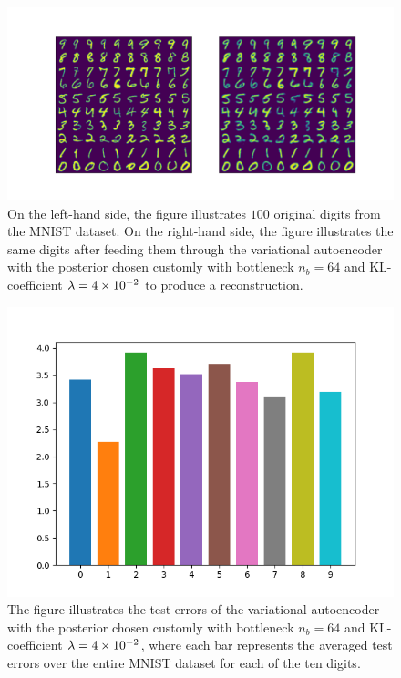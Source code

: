\begin{figure}
\begin{center}
      \includegraphics[trim = 15mm 10mm 15mm 15mm, clip, width=\linewidth]{convolutional_VAE_new_idea_KL_4e-2_10k_epochs_64D_inference}
\end{center}
\caption{On the left-hand side, the figure illustrates $100$ original digits from the MNIST dataset. On the right-hand side, the figure illustrates the same digits after feeding them through the variational autoencoder with the posterior chosen customly with bottleneck $n_b=64$ and KL-coefficient $\lambda=\num{4e-2}$ to produce a reconstruction.}\label{fig:convolutional_VAE_new_idea_KL_4e-2_10k_epochs_64D_inference}
\end{figure}


\begin{figure}
\begin{center}
      \includegraphics[width=0.49\linewidth]{convolutional_VAE_new_idea_KL_4e-2_10k_epochs_64D_errors}
\end{center}
\caption{The figure illustrates the test errors of the variational autoencoder with the posterior chosen customly with bottleneck $n_b=64$ and KL-coefficient $\lambda = \num{4e-2}$, where each bar represents the averaged test errors over the entire MNIST dataset for each of the ten digits.}\label{fig:convolutional_VAE_new_idea_KL_4e-2_10k_epochs_64D_errors}
\end{figure}



